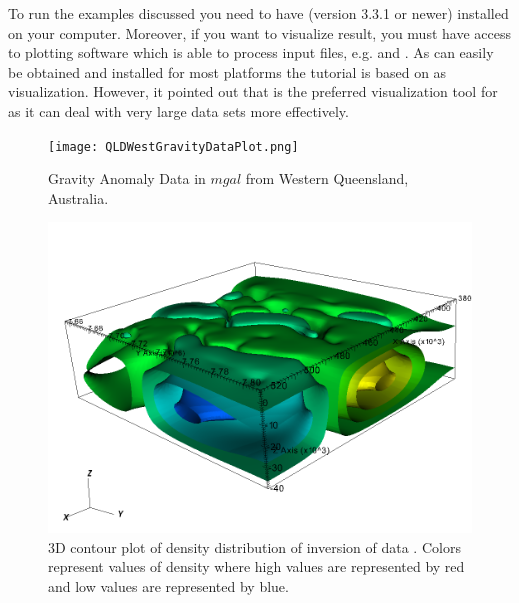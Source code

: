 To run the examples discussed you need to have \escript (version 3.3.1 or newer) installed on your computer.
Moreover, if you want to visualize result, you must have access to plotting software which is able to process
\VTK input files, e.g. \mayavi and \VisIt. As \mayavi can easily be obtained and installed for most platforms
the tutorial is based on \mayavi as visualization. However, it pointed out 
that \VisIt is the preferred visualization tool for \escript as it can deal with very large data sets more effectively.
    
\begin{figure}
\centering
\texttt{[image: QLDWestGravityDataPlot.png]}
\caption{Gravity Anomaly Data in $mgal$ from Western Queensland, Australia.  }
\label{FIG:P1:GRAV:0}
\end{figure}

\begin{figure}
\centering
\includegraphics[width=\textwidth]{density10.png}
\caption{3D contour plot of density distribution of inversion of data . Colors
represent values of density where high values are represented by red and low values are represented by blue.}
\label{FIG:P1:GRAV:1}
\end{figure}

